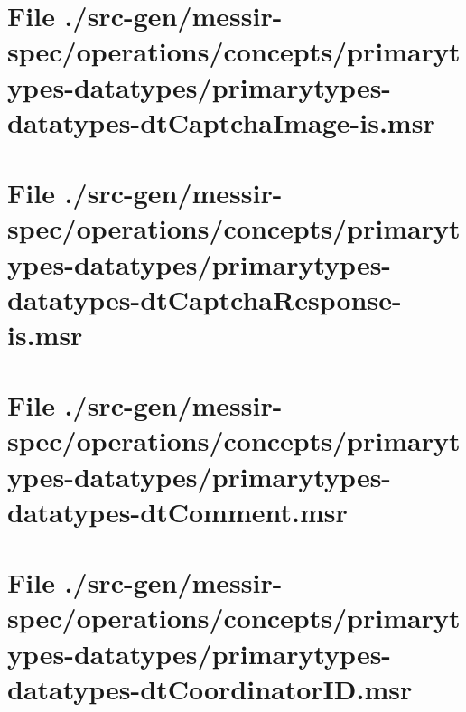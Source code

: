 \section[File /src-gen/messir-spec.../primarytypes-datatypes-dtCaptchaImage-is.msr]{File ./src-gen/messir-spec/operations/concepts/primarytypes-datatypes/primarytypes-datatypes-dtCaptchaImage-is.msr}
\scriptsize

\normalsize
	
\section[File /src-gen/messir-spec.../primarytypes-datatypes-dtCaptchaResponse-is.msr]{File ./src-gen/messir-spec/operations/concepts/primarytypes-datatypes/primarytypes-datatypes-dtCaptchaResponse-is.msr}
\scriptsize

\normalsize
	
\section[File /src-gen/messir-spec/operations.../primarytypes-datatypes-dtComment.msr]{File ./src-gen/messir-spec/operations/concepts/primarytypes-datatypes/primarytypes-datatypes-dtComment.msr}
\scriptsize

\normalsize
	
\section[File /src-gen/messir-spec.../primarytypes-datatypes-dtCoordinatorID.msr]{File ./src-gen/messir-spec/operations/concepts/primarytypes-datatypes/primarytypes-datatypes-dtCoordinatorID.msr}
\scriptsize

\normalsize
	
